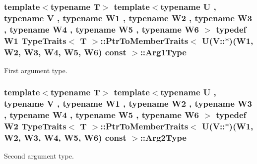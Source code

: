 \subsubsection[{\texorpdfstring{Arg1\+Type}{Arg1Type}}]{\setlength{\rightskip}{0pt plus 5cm}template$<$typename T$>$ template$<$typename U , typename V , typename W1 , typename W2 , typename W3 , typename W4 , typename W5 , typename W6 $>$ typedef W1 {\bf Type\+Traits}$<$ T $>$\+::{\bf Ptr\+To\+Member\+Traits}$<$ U(V\+::$\ast$)(W1, W2, W3, W4, W5, W6) const  $>$\+::{\bf Arg1\+Type}}\hypertarget{structTypeTraits_1_1PtrToMemberTraits_3_01U_07V_1_1_5_08_07W1_00_01W2_00_01W3_00_01W4_00_01W5_00_01W6_08_01const_01_01_4_a0237b480395f8159b505bd16216db158}{}\label{structTypeTraits_1_1PtrToMemberTraits_3_01U_07V_1_1_5_08_07W1_00_01W2_00_01W3_00_01W4_00_01W5_00_01W6_08_01const_01_01_4_a0237b480395f8159b505bd16216db158}
First argument type. 
\subsubsection[{\texorpdfstring{Arg2\+Type}{Arg2Type}}]{\setlength{\rightskip}{0pt plus 5cm}template$<$typename T$>$ template$<$typename U , typename V , typename W1 , typename W2 , typename W3 , typename W4 , typename W5 , typename W6 $>$ typedef W2 {\bf Type\+Traits}$<$ T $>$\+::{\bf Ptr\+To\+Member\+Traits}$<$ U(V\+::$\ast$)(W1, W2, W3, W4, W5, W6) const  $>$\+::{\bf Arg2\+Type}}\hypertarget{structTypeTraits_1_1PtrToMemberTraits_3_01U_07V_1_1_5_08_07W1_00_01W2_00_01W3_00_01W4_00_01W5_00_01W6_08_01const_01_01_4_a1fe8bed808222b4bb96a51067604b2b6}{}\label{structTypeTraits_1_1PtrToMemberTraits_3_01U_07V_1_1_5_08_07W1_00_01W2_00_01W3_00_01W4_00_01W5_00_01W6_08_01const_01_01_4_a1fe8bed808222b4bb96a51067604b2b6}
Second argument type. 
